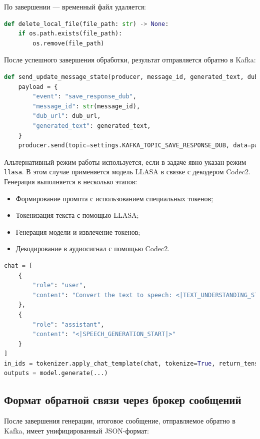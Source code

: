 По завершении — временный файл удаляется:

\begin{lstlisting}[language=Python, numbers=none, frame=none]
def delete_local_file(file_path: str) -> None:
    if os.path.exists(file_path):
        os.remove(file_path)
\end{lstlisting}

После успешного завершения обработки, результат отправляется обратно в Kafka:

\begin{lstlisting}[language=Python, numbers=none, frame=none]
def send_update_message_state(producer, message_id, generated_text, dub_url):
    payload = {
        "event": "save_response_dub",
        "message_id": str(message_id),
        "dub_url": dub_url,
        "generated_text": generated_text,
    }
    producer.send(topic=settings.KAFKA_TOPIC_SAVE_RESPONSE_DUB, data=payload)
\end{lstlisting}


Альтернативный режим работы используется, если в задаче явно указан режим
\texttt{llasa}. В этом случае применяется модель LLASA в связке с декодером Codec2.
Генерация выполняется в несколько этапов:

\begin{itemize}
\item Формирование промпта с использованием специальных токенов;
\item Токенизация текста с помощью LLASA;
\item Генерация модели и извлечение токенов;
\item Декодирование в аудиосигнал с помощью Codec2.
\end{itemize}

\begin{lstlisting}[language=Python, numbers=none, frame=none]
chat = [
    {
        "role": "user",
        "content": "Convert the text to speech: <|TEXT_UNDERSTANDING_START|>...<|TEXT_UNDERSTANDING_END|>"
    },
    {
        "role": "assistant",
        "content": "<|SPEECH_GENERATION_START|>"
    }
]
in_ids = tokenizer.apply_chat_template(chat, tokenize=True, return_tensors='pt')
outputs = model.generate(...)
\end{lstlisting}

\subsection{Формат обратной связи через брокер сообщений}
После завершения генерации, итоговое сообщение, отправляемое обратно в Kafka,
имеет унифицированный JSON-формат:

